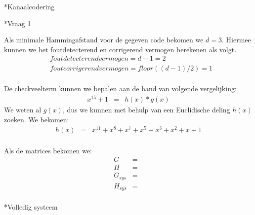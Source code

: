 \documentclass[]{article}
\begin{document}
\begin{section}*{Kanaalcodering}
	\begin{subsection}*{Vraag 1}

        Als minimale Hammingafstand voor de gegeven code bekomen we $d=3$. 
        Hiermee kunnen we het foutdetecterend en corrigerend vermogen berekenen als volgt.
        \begin{eqnarray*}
        	& foutdetecterend vermogen = d-1 = 2 \\
        	& foutcorrigerend vermogen = floor((d-1)/2) = 1 \\
        \end{eqnarray*}
        
        De checkveelterm kunnen we bepalen aan de hand van volgende vergelijking:
        \begin{eqnarray*}
        	x^{15} + 1 &=& h(x) * g(x)
        \end{eqnarray*}
        We weten al $g(x)$, dus we kunnen met behulp van een Euclidische deling $h(x)$ 
        zoeken. We bekomen:
        \begin{eqnarray*}
        	h(x) &=& x^{11} + x^8 + x^7 + x^5 + x^3 + x^2 + x + 1 \\
        \end{eqnarray*}
        
        Als de matrices bekomen we:
        \begin{eqnarray*}
        G &=&\\
        H &=&\\
        G_{sys} &=&\\
        H_{sys} &=&\\
        \end{eqnarray*}

   	\end{subsection}
\end{section}

\begin{section}*{Volledig systeem}
\end{section}
\end{document}
